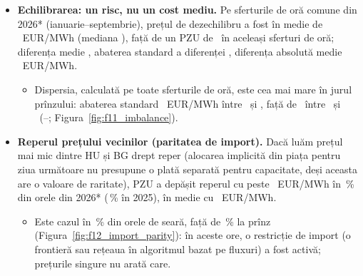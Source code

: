 \begin{itemize}
\begin{itemize}
  {ROPEX\_FM descrie contractele aflate în livrare, încheiate la date diferite; nu este o estimare a unei prime de risc ex ante. Deja contractat pentru 2027: \NvolNext\ TWh, la aproximativ \NfwdNext\ EUR/MWh (raportul OPCOM din \NropexDate).}
  \end{itemize}
\item {}%
{\textbf{Echilibrarea: un risc, nu un cost mediu.} Pe sferturile de oră comune din 2026* (ianuarie--septembrie), prețul de dezechilibru a fost în medie de \NimbSix\ EUR/MWh (mediana \NimbMedSix), față de un PZU de \NpzuImbSix\ în aceleași sferturi de oră; diferența medie \NsprSix, abaterea standard a diferenței \NsprSdSix, diferența absolută medie \NsprAbsSix\ EUR/MWh.}
  \begin{itemize}
  \item {}%
  {Dispersia, calculată pe toate sferturile de oră, este cea mai mare în jurul prînzului: abaterea standard \NsdMid\ EUR/MWh între \NmidA\ și \NmidB, față de \NsdEve\ între \NeveA\ și \NeveB\ (\NtwStart--\NtwEnd; Figura~\ref{fig:f11_imbalance}).}
  \end{itemize}
\item {}%
{\textbf{Reperul prețului vecinilor (paritatea de import).} Dacă luăm prețul mai mic dintre HU și BG drept reper (alocarea implicită din piața pentru ziua următoare nu presupune o plată separată pentru capacitate, deși aceasta are o valoare de raritate), PZU a depășit reperul cu peste \NsepThr\ EUR/MWh în \NaboveSix\,\% din orele din 2026* (\NaboveFive\,\% în 2025), în medie cu \NgapSix\ EUR/MWh.}
  \begin{itemize}
  \item {}%
  {Este cazul în \NaboveEve\,\% din orele de seară, față de \NaboveMid\,\% la prînz (Figura~\ref{fig:f12_import_parity}): în aceste ore, o restricție de import (o frontieră sau rețeaua în algoritmul bazat pe fluxuri) a fost activă; prețurile singure nu arată care.}
  \end{itemize}
\end{itemize}

